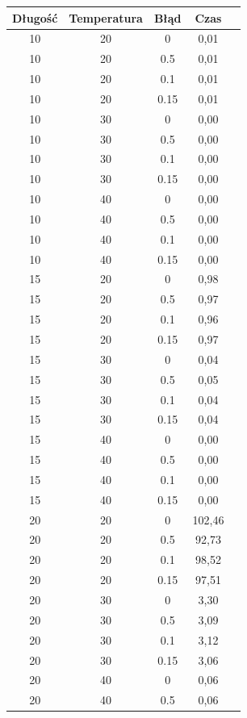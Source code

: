 \documentclass{article}
\begin{document}
\begin{longtable}{c|c|c|c|c}
Długość  & Temperatura  & Błąd & Czas  \\
\hline
10     & 20   & 0     & 0,01   \\
10     & 20   & 0.5   & 0,01   \\
10     & 20   & 0.1   & 0,01   \\
10     & 20   & 0.15  & 0,01   \\
10     & 30   & 0     & 0,00   \\
10     & 30   & 0.5   & 0,00   \\
10     & 30   & 0.1   & 0,00   \\
10     & 30   & 0.15  & 0,00   \\
10     & 40   & 0     & 0,00   \\
10     & 40   & 0.5   & 0,00   \\
10     & 40   & 0.1   & 0,00   \\
10     & 40   & 0.15  & 0,00   \\
15     & 20   & 0     & 0,98   \\
15     & 20   & 0.5   & 0,97   \\
15     & 20   & 0.1   & 0,96   \\
15     & 20   & 0.15  & 0,97   \\
15     & 30   & 0     & 0,04   \\
15     & 30   & 0.5   & 0,05   \\
15     & 30   & 0.1   & 0,04   \\
15     & 30   & 0.15  & 0,04   \\
15     & 40   & 0     & 0,00   \\
15     & 40   & 0.5   & 0,00   \\
15     & 40   & 0.1   & 0,00   \\
15     & 40   & 0.15  & 0,00   \\
20     & 20   & 0     & 102,46 \\
20     & 20   & 0.5   & 92,73 \\
20     & 20   & 0.1   & 98,52 \\
20     & 20   & 0.15  & 97,51 \\
20     & 30   & 0     & 3,30   \\
20     & 30   & 0.5   & 3,09   \\
20     & 30   & 0.1   & 3,12   \\
20     & 30   & 0.15  & 3,06   \\
20     & 40   & 0     & 0,06   \\
20     & 40   & 0.5   & 0,06   \\

\end{longtable}
\end{document}
